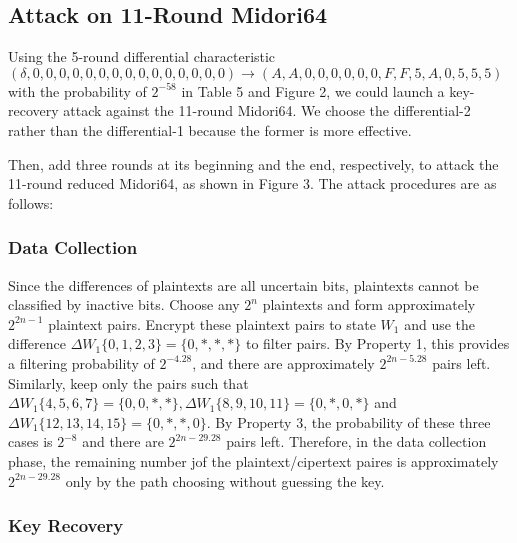 \documentclass{article}
\begin{document}
\subsection{Attack on 11-Round Midori64}

Using the 5-round differential characteristic $(\delta, 0, 0, 0, 0, 0, 0, 0, 0, 0, 0, 0, 0, 0, 0, 0) \to (A, A, 0, 0, 0, 0, 0, 0, F, F, 5, A, 0, 5, 5, 5)$ with the probability of $2^{-58}$ in Table 5 and Figure 2, we could launch a key-recovery attack against the 11-round Midori64. We choose the differential-2 rather than the differential-1 because the former is more effective.

Then, add three rounds at its beginning and the end, respectively, to attack the 11-round reduced Midori64, as shown in Figure 3. The attack procedures are as follows:

\subsubsection{Data Collection}
Since the differences of plaintexts are all uncertain bits, plaintexts cannot be classified by inactive bits. Choose any $2^n$ plaintexts and form approximately $2^{2n-1}$ plaintext pairs. Encrypt these plaintext pairs to state $W_1$ and use the difference $\Delta W_1\{0, 1, 2, 3\} = \{0, \ast, \ast, \ast\}$ to filter pairs. By Property 1, this provides a filtering probability of $2^{-4.28}$, and there are approximately $2^{2n-5.28}$ pairs left. Similarly, keep only the pairs such that $\Delta W_1 \{4, 5, 6, 7\} = \{0, 0, \ast, \ast \}, \Delta W_1 \{8, 9, 10, 11\} = \{0, \ast, 0, \ast \}$ and $\Delta W_1 \{12, 13, 14, 15\} = \{0, \ast, \ast, 0\}$. By Property 3, the probability of these three cases is $2^{-8}$ and there are $2^{2n - 29.28}$ pairs left. Therefore, in the data collection phase, the remaining number jof the plaintext/cipertext paires is approximately $2^{2n - 29.28}$ only by the path choosing without guessing the key.

\subsubsection{Key Recovery}
\end{document}
